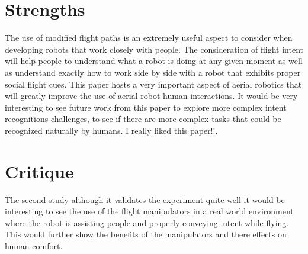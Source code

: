 \documentclass{article}
\begin{document}
\section*{Strengths}
The use of modified flight paths is an extremely useful aspect to consider when developing robots that work closely with people. The consideration of flight intent will help people to understand what a robot is doing at any given moment as well as understand exactly how to work side by side with a robot that exhibits proper social flight cues. This paper hosts a very important aspect of aerial robotics that will greatly improve the use of aerial robot human interactions. It would be very interesting to see future work from this paper to explore more complex intent recognitions challenges, to see if there are more complex tasks that could be recognized naturally by humans. I really liked this paper!!.
\section*{Critique}
The second study although it validates the experiment quite well it would be interesting to see the use of the flight manipulators in a real world environment where the robot is assisting people and properly conveying intent while flying. This would further show the benefits of the manipulators and there effects on human comfort.
\cite{Unhelkar:2014:CPH:2559636.2559655}
\end{document}
